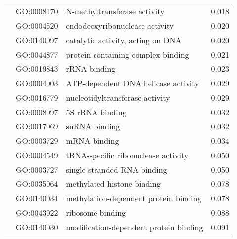 \begin{longtable}{lllr}
   & GO:0008170 &                 N-methyltransferase activity &         0.018 \\
   & GO:0004520 &               endodeoxyribonuclease activity &         0.020 \\
   & GO:0140097 &            catalytic activity, acting on DNA &         0.020 \\
   & GO:0044877 &           protein-containing complex binding &         0.021 \\
   & GO:0019843 &                                 rRNA binding &         0.023 \\
   & GO:0004003 &          ATP-dependent DNA helicase activity &         0.029 \\
   & GO:0016779 &              nucleotidyltransferase activity &         0.029 \\
   & GO:0008097 &                              5S rRNA binding &         0.032 \\
   & GO:0017069 &                                snRNA binding &         0.032 \\
   & GO:0003729 &                                 mRNA binding &         0.034 \\
   & GO:0004549 &          tRNA-specific ribonuclease activity &         0.050 \\
   & GO:0003727 &                  single-stranded RNA binding &         0.050 \\
   & GO:0035064 &                   methylated histone binding &         0.078 \\
   & GO:0140034 &        methylation-dependent protein binding &         0.078 \\
   & GO:0043022 &                             ribosome binding &         0.088 \\
   & GO:0140030 &       modification-dependent protein binding &         0.091 \\
\end{longtable}
